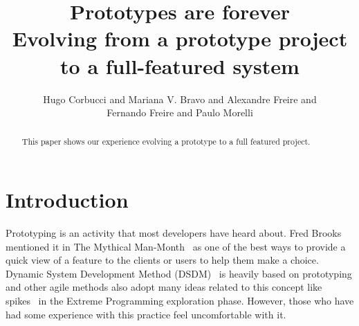 \documentclass[lnbip]{svmultln}
\begin{document}
%
\mainmatter              %
%
\title{Prototypes are forever\\
  Evolving from a prototype project\\ to a full-featured system}
%
%
\author{Hugo Corbucci and Mariana V. Bravo  and
  Alexandre Freire and\\Fernando Freire and Paulo Morelli}
%
%
%

\maketitle              %

\begin{abstract}        %

This paper shows our experience evolving a prototype to a full featured project.
\end{abstract}
%
\section{Introduction}

Prototyping is an activity that most developers have heard about. Fred
Brooks mentioned it in The Mythical Man-Month~\cite{Brooks1975} as one
of the best ways to provide a quick view of a feature to the clients
or users to help them make a choice. Dynamic System Development Method
(DSDM)~\cite{DSDM} is heavily based on prototyping and other agile
methods also adopt many ideas related to this concept like
spikes~\cite{XP} in the Extreme Programming exploration
phase. However, those who have had some experience with this practice
feel uncomfortable with it\cite{quem disse? esse tipo de afirmação é
  sempre bom ter uma citação, já apanhei bastante sobre isso.  ale}.
\end{document}
